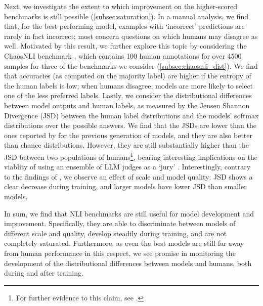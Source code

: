 Next, we investigate the extent to which improvement on the higher-scored benchmarks is still possible (\cref{subsec:saturation}).
In a manual analysis, we find that, for the best performing model, examples with `incorrect' predictions are rarely in fact incorrect; most concern questions on which humans may disagree as well.
Motivated by this result, we further explore this topic by considering the ChaosNLI benchmark \citep{nie-etal-2020-learn}, which contains 100 human annotations for over 4500 samples for three of the benchmarks we consider (\cref{subsec:chaosnli_dist}).
We find that accuracies (as computed on the majority label) are higher if the entropy of the human labels is low; when humans disagree, models are more likely to select one of the less preferred labels.
Lastly, we consider the distributional differences between model outputs and human labels, as measured by the Jensen Shannon Divergence (JSD) between the human label distributions and the models' softmax distributions over the possible answers.
We find that the JSDs are lower than the ones reported by \citet{nie-etal-2020-learn} for the previous generation of models, and they are also better than chance distributions. 
However, they are still substantially higher than the JSD between two populations of humans\footnote{For further evidence to this claim, see \citet{baan-etal-2022-stop}.}, bearing interesting implications on the viablity of using an ensemble of LLM judges as a `jury' \citep[e.g.][]{verga2024replacing}.
Interestingly, contrary to the findings of \citet{nie-etal-2020-learn}, we observe an effect of scale and model quality: JSD shows a clear decrease during training, and larger models have lower JSD than smaller models.

In sum, we find that NLI benchmarks are still useful for model development and improvement.
Specifically, they are able to discriminate between models of different scale and quality, develop steadily during training, and are not completely saturated.
Furthermore, as even the best models are still far away from human performance in this respect, we see promise in monitoring the development of the distributional differences between models and humans, both during and after training.
